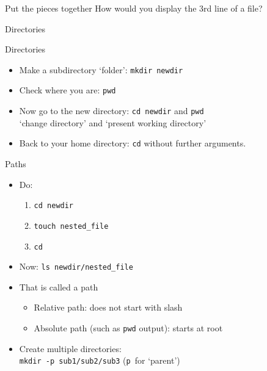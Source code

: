 \documentclass[11pt,headernav]{beamer}
\begin{document}


\begin{exerciseframe}{Put the pieces together}
  How would you display the 3rd line of a file?
\end{exerciseframe}

 {Directories}

\begin{numberedframe}{Directories}
  \label{sl-lnx:cd}
  \begin{itemize}
  \item Make a subdirectory `folder': \lstinline{mkdir newdir}
  \item Check where you are: \lstinline{pwd}
  \item Now go to the new directory: \lstinline{cd newdir} and \lstinline{pwd}\\
    `change directory' and `present working directory'
  \item Back to your home directory: \lstinline{cd} without further arguments.
  \end{itemize}
\end{numberedframe}


\begin{numberedframe}{Paths}
  \label{sl-lnx:path}
  \begin{itemize}
  \item Do:
    \begin{enumerate}
    \item \lstinline{cd newdir} \item \lstinline{touch nested_file} \item \lstinline{cd}
    \end{enumerate}
  \item Now: \lstinline{ls newdir/nested_file}
  \item That is called a path
    \begin{itemize}
    \item Relative path: does not start with slash
    \item Absolute path (such as \lstinline{pwd} output): starts at root
    \end{itemize}
  \item Create multiple directories:\\
    \lstinline{mkdir -p sub1/sub2/sub3} (\lstinline{p}~for `parent')
  \end{itemize}
\end{numberedframe}
\end{document}
